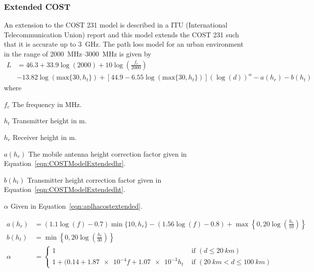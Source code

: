 \subsubsection{Extended COST}
An extension to the COST 231 model is described in a ITU (International Telecommunication Union) report \cite{itu2002report} and this model extends the COST 231 such that it is accurate up to \SI{3}{GHz}. The path loss model for an urban environment in the range of \SIrange{2000}{3000}{MHz} is given by \cite{itu2002report}
\begin{equation}%
\label{eqn:COSTModelExtended}
\begin{aligned}
    L &= 46.3 + 33.9 \log(2000) + 10 \log\left(\frac{f_c}{2000}\right) \\
        &- 13.82 \log(\text{max}\{30,h_t\}) + [44.9 -6.55 \log(\text{max}\{30,h_t\})] (\log(d))^{\alpha} - a(h_r) - b(h_t)
\end{aligned}
\end{equation} 
where
\begin{where}
\item [$f_c$] The frequency in \si{MHz}.
\item [$h_t$] Transmitter height in \si{m}. 
\item [$h_r$] Receiver height in \si{m}.
\item [$a(h_r)$] The mobile antenna height correction factor given in Equation~\ref{eqn:COSTModelExtendedhr}.
\item [$b(h_t)$] Transmitter height correction factor given in Equation~\ref{eqn:COSTModelExtendedht}.
\item [$\alpha$] Given in Equation~\ref{eqn:aplhacostextended}.
\end{where}
\begin{align} %
\label{eqn:COSTModelExtendedhr}
a(h_r)&=(1.1\log(f)-0.7) \min\{10,h_r\}-(1.56\log(f)-0.8)+\max\left\{0,20\log\left(\frac{h_r}{10}\right)\right\}\\
\label{eqn:COSTModelExtendedht}
b(h_t)&= \min\left\{0,20\log\left(\frac{h_t}{30}\right)\right\}\\
\label{eqn:aplhacostextended}
\alpha &= 
  \begin{cases}
      1 & \text{ if } (d \leq \SI{20}{km}) \\
    1+(0.14+\num{1.87e-4} f + \num{1.07e-3} h_t & \text{ if } (\SI{20}{km} < d \leq \SI{100}{km})
  \end{cases}
\end{align} 
